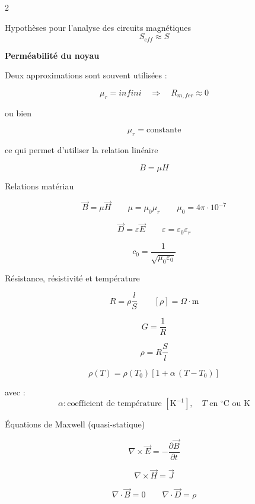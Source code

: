 \documentclass[10pt,a4paper]{article}
\begin{document}
\begin{multicols}{2}
\begin{metbox}{Hypothèses pour l'analyse des circuits magnétiques}
\[
S_{eff} \approx S
\]

\medskip
\textbf{Perméabilité du noyau}

Deux approximations sont souvent utilisées :

\[
\mu_r = infini
\quad \Rightarrow \quad
R_{m,fer} \approx 0
\]

ou bien

\[
\mu_r = \text{constante}
\]

ce qui permet d'utiliser la relation linéaire

\[
B=\mu H
\]

\end{metbox}

\begin{metbox}{Relations matériau}

\[
\vec B=\mu \vec H
\qquad
\mu=\mu_0\mu_r
\qquad
\mu_0=4\pi\cdot10^{-7}
\]

\[
\vec D=\varepsilon \vec E
\qquad
\varepsilon=\varepsilon_0\varepsilon_r
\]

\[
c_0=\frac{1}{\sqrt{\mu_0\varepsilon_0}}
\]

\end{metbox}

\begin{metbox}{Résistance, résistivité et température}

\[
\boxed{R=\rho\frac{l}{S}}
\qquad
\left[\rho\right]=\Omega\cdot\text{m}
\]

\[
G=\frac{1}{R}
\]

\[
\boxed{\rho = R\frac{S}{l}}
\]

\[
\boxed{\rho(T)=\rho(T_0)\left[1+\alpha\,(T-T_0)\right]}
\]

avec :
\[
\alpha : \text{coefficient de température } \left[\text{K}^{-1}\right],
\quad T \text{ en } ^\circ\text{C ou K}
\]

\end{metbox}

\begin{metbox}{Équations de Maxwell (quasi-statique)}

\[
\nabla\times \vec E=-\frac{\partial \vec B}{\partial t}
\]

\[
\nabla\times \vec H=\vec J
\]

\[
\nabla\cdot \vec B=0
\qquad
\nabla\cdot \vec D=\rho
\]

\end{metbox}


\end{multicols}
\end{document}
